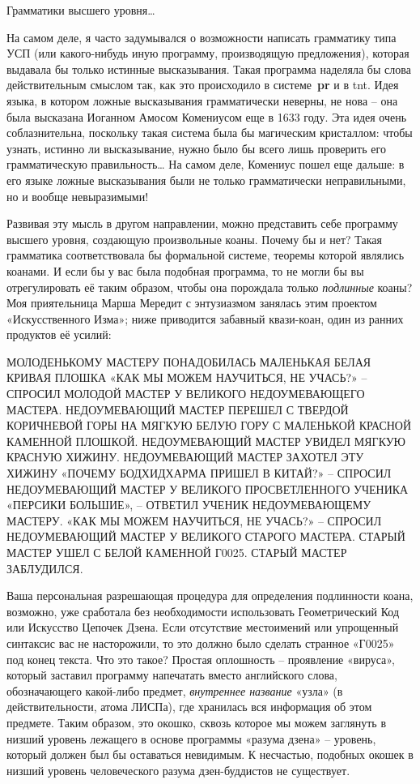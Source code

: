 \documentclass[../main.tex]{subfiles}
\begin{document}
Грамматики высшего уровня\ldots{}

На самом деле, я часто задумывался о возможности написать грамматику типа УСП (или какого-нибудь иную программу, производящую предложения), которая выдавала бы только истинные высказывания. Такая программа наделяла бы слова действительным смыслом так, как это происходило в системе~\textbf{pr} и в \acs{tnt}\@. Идея языка, в котором ложные высказывания грамматически неверны, не нова \--- она была высказана Иоганном Амосом Комениусом еще в 1633 году. Эта идея очень соблазнительна, поскольку такая система была бы магическим кристаллом: чтобы узнать, истинно ли высказывание, нужно было бы всего лишь проверить его грамматическую правильность\ldots{} На самом деле, Комениус пошел еще дальше: в его языке ложные высказывания были не только грамматически неправильными, но и вообще невыразимыми!

Развивая эту мысль в другом направлении, можно представить себе программу высшего уровня, создающую произвольные коаны. Почему бы и нет? Такая грамматика соответствовала бы формальной системе, теоремы которой являлись коанами. И если бы у вас была подобная программа, то не могли бы вы отрегулировать её таким образом, чтобы она порождала только \emph{подлинные} коаны? Моя приятельница Марша Мередит с энтузиазмом занялась этим проектом «Искусственного Изма»; ниже приводится забавный квази-коан, один из ранних продуктов её усилий:

МОЛОДЕНЬКОМУ МАСТЕРУ ПОНАДОБИЛАСЬ МАЛЕНЬКАЯ БЕЛАЯ КРИВАЯ ПЛОШКА «КАК МЫ МОЖЕМ НАУЧИТЬСЯ, НЕ УЧАСЬ?» \--- СПРОСИЛ МОЛОДОЙ МАСТЕР У ВЕЛИКОГО НЕДОУМЕВАЮЩЕГО МАСТЕРА. НЕДОУМЕВАЮЩИЙ МАСТЕР ПЕРЕШЕЛ С ТВЕРДОЙ КОРИЧНЕВОЙ ГОРЫ НА МЯГКУЮ БЕЛУЮ ГОРУ С МАЛЕНЬКОЙ КРАСНОЙ КАМЕННОЙ ПЛОШКОЙ. НЕДОУМЕВАЮЩИЙ МАСТЕР УВИДЕЛ МЯГКУЮ КРАСНУЮ ХИЖИНУ. НЕДОУМЕВАЮЩИЙ МАСТЕР ЗАХОТЕЛ ЭТУ ХИЖИНУ «ПОЧЕМУ БОДХИДХАРМА ПРИШЕЛ В КИТАЙ?» \--- СПРОСИЛ НЕДОУМЕВАЮЩИЙ МАСТЕР У ВЕЛИКОГО ПРОСВЕТЛЕННОГО УЧЕНИКА «ПЕРСИКИ БОЛЬШИЕ», \--- ОТВЕТИЛ УЧЕНИК НЕДОУМЕВАЮЩЕМУ МАСТЕРУ. «КАК МЫ МОЖЕМ НАУЧИТЬСЯ, НЕ УЧАСЬ?» \--- СПРОСИЛ НЕДОУМЕВАЮЩИЙ МАСТЕР У ВЕЛИКОГО СТАРОГО МАСТЕРА. СТАРЫЙ МАСТЕР УШЕЛ С БЕЛОЙ КАМЕННОЙ Г0025. СТАРЫЙ МАСТЕР ЗАБЛУДИЛСЯ.

Ваша персональная разрешающая процедура для определения подлинности коана, возможно, уже сработала без необходимости использовать Геометрический Код или Искусство Цепочек Дзена. Если отсутствие местоимений или упрощенный синтаксис вас не насторожили, то это должно было сделать странное «Г0025» под конец текста. Что это такое? Простая оплошность \--- проявление «вируса», который заставил программу напечатать вместо английского слова, обозначающего какой-либо предмет, \emph{внутреннее название} «узла» (в действительности, атома ЛИСПа), где хранилась вся информация об этом предмете. Таким образом, это окошко, сквозь которое мы можем заглянуть в низший уровень лежащего в основе программы «разума дзена» \--- уровень, который должен был бы оставаться невидимым. К несчастью, подобных окошек в низший уровень человеческого разума дзен-буддистов не существует.
\end{document}
